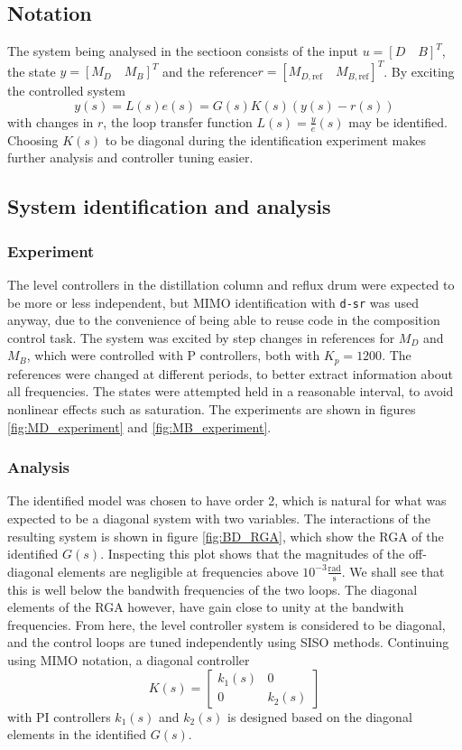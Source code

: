 \documentclass[12pt]{article}
\begin{document}
\subsection{Notation}
The system being analysed in the sectioon consists of the input $u = [D \quad B]^T$, the state $y = [M_D \quad M_B]^T$ and the reference$r = [M_{D, \textrm{ref}} \quad M_{B, \textrm{ref}}]^T$. By exciting the controlled system
\begin{equation}
y(s) = L(s)e(s) = G(s) K(s) (y(s) - r(s))
\end{equation}
with changes in $r$, the loop transfer function $L(s) = \frac{y}{e}(s)$ may be identified. Choosing $K(s)$ to be diagonal during the identification experiment makes further analysis and controller tuning easier.

\subsection{System identification and analysis}
\subsubsection{Experiment}
The level controllers in the distillation column and reflux drum were expected to be more or less independent, but MIMO identification with \texttt{d-sr} was used anyway, due to the convenience of being able to reuse code in the composition control task. The system was excited by step changes in references for $M_D$ and $M_B$, which were controlled with P controllers, both with $K_p = 1200$. The references were changed at different periods, to better extract information about all frequencies. The states were attempted held in a reasonable interval, to avoid nonlinear effects such as saturation. The experiments are shown in figures \ref{fig:MD_experiment} and \ref{fig:MB_experiment}.

\subsubsection{Analysis}
The identified model was chosen to have order 2, which is natural for what was expected to be a diagonal system with two variables. The interactions of the resulting system is shown in figure \ref{fig:BD_RGA}, which show the RGA of the identified $G(s)$. Inspecting this plot shows that the magnitudes of the off-diagonal elements are negligible at frequencies above $10^{-3} \frac{\textrm{rad}}{\textrm{s}}$. We shall see that this is well below the bandwith frequencies of the two loops. The diagonal elements of the RGA however, have gain close to unity at the bandwith frequencies. From here, the level controller system is considered to be diagonal, and the control loops are tuned independently using SISO methods. Continuing using MIMO notation, a diagonal controller
\begin{equation}
K(s) =
\begin{bmatrix}
k_1(s) & 0\\
0 & k_2(s)
\end{bmatrix}
\end{equation}
with PI controllers $k_1(s)$ and $k_2(s)$ is designed based on the diagonal elements in the identified $G(s)$.
\end{document}
